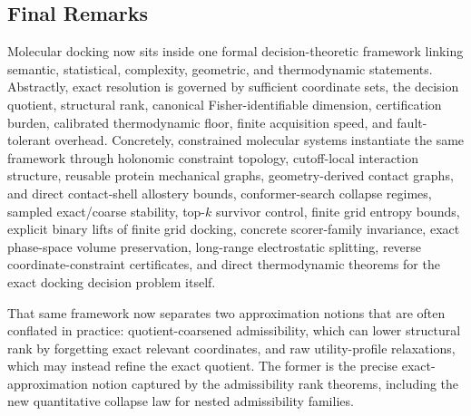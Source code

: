 \subsection{Final Remarks}

Molecular docking now sits inside one formal decision-theoretic framework linking semantic, statistical, complexity, geometric, and thermodynamic statements. Abstractly, exact resolution is governed by sufficient coordinate sets, the decision quotient, structural rank, canonical Fisher-identifiable dimension, certification burden, calibrated thermodynamic floor, finite acquisition speed, and fault-tolerant overhead. Concretely, constrained molecular systems instantiate the same framework through holonomic constraint topology, cutoff-local interaction structure, reusable protein mechanical graphs, geometry-derived contact graphs, and direct contact-shell allostery bounds, conformer-search collapse regimes, sampled exact/coarse stability, top-$k$ survivor control, finite grid entropy bounds, explicit binary lifts of finite grid docking, concrete scorer-family invariance, exact phase-space volume preservation, long-range electrostatic splitting, reverse coordinate-constraint certificates, and direct thermodynamic theorems for the exact docking decision problem itself.

That same framework now separates two approximation notions that are often conflated in practice: quotient-coarsened admissibility, which can lower structural rank by forgetting exact relevant coordinates, and raw utility-profile relaxations, which may instead refine the exact quotient. The former is the precise exact-approximation notion captured by the admissibility rank theorems, including the new quantitative collapse law for nested admissibility families.

